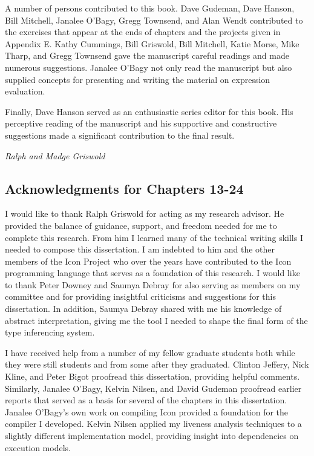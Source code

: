 A number of persons contributed to this book. Dave Gudeman, Dave
Hanson, Bill Mitchell, Janalee O'Bagy, Gregg Townsend, and Alan Wendt
contributed to the exercises that appear at the ends of chapters and
the projects given in Appendix E. Kathy Cummings, Bill Griswold, Bill
Mitchell, Katie Morse, Mike Tharp, and Gregg Townsend gave the
manuscript careful readings and made numerous suggestions. Janalee
O'Bagy not only read the manuscript but also supplied concepts for
presenting and writing the material on expression evaluation.

Finally, Dave Hanson served as an enthusiastic series editor for this
book. His perceptive reading of the manuscript and his supportive
and constructive suggestions made a significant contribution to the
final result.

\hfill {\em Ralph and Madge Griswold}

\subsection*{Acknowledgments for Chapters 13-24}

I would like to thank Ralph Griswold for acting as my research advisor. He provided the balance of guidance, support,
and freedom needed for me to complete this research. From him I learned many of the technical writing skills I needed
to compose this dissertation. I am indebted to him and the other members of the Icon Project who over the years have
contributed to the Icon programming language that serves as a foundation of this research. I would like to thank Peter
Downey and Saumya Debray for also serving as members on my committee and for providing insightful criticisms and
suggestions for this dissertation. In addition, Saumya Debray shared with me his knowledge of abstract interpretation,
giving me the tool I needed to shape the final form of the type inferencing system. 


I have received help from a number of my fellow graduate students both while they were still students and from some
after they graduated. Clinton Jeffery, Nick Kline, and Peter Bigot proofread this dissertation, providing helpful
comments. Similarly, Janalee O'Bagy, Kelvin Nilsen, and David Gudeman proofread earlier reports that served as a basis
for several of the chapters in this dissertation. Janalee O'Bagy's own work on compiling Icon provided a foundation for
the compiler I developed. Kelvin Nilsen applied my liveness analysis techniques to a slightly different implementation
model, providing insight into dependencies on execution models. 


